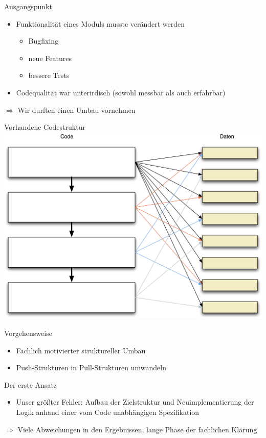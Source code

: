 \begin{frame}[t,fragile]{Ausgangspunkt}
\begin{itemize}
\item Funktionalität eines Moduls musste verändert werden
\begin{itemize}
\item Bugfixing
\item neue Features
\item bessere Tests
\end{itemize}
\item Codequalität war unterirdisch (sowohl messbar als auch erfahrbar)
\end{itemize}

$\Longrightarrow$ Wir durften einen Umbau vornehmen
\end{frame}

\begin{frame}[t,fragile]{Vorhandene Codestruktur}
\includegraphics[width=.8 \paperwidth]{Codestruktur.png}
\end{frame}



\begin{frame}[t,fragile]{Vorgehensweise}
\begin{itemize}
\item Fachlich motivierter struktureller Umbau
\item Push-Strukturen in Pull-Strukturen umwandeln
\end{itemize}
\end{frame}

\begin{frame}[t,fragile]{Der erste Ansatz}
\begin{itemize}
\item Unser größter Fehler: Aufbau der Zielstruktur und Neuimplementierung der Logik anhand einer vom Code unabhängigen Spezifikation
\end{itemize}
$\Longrightarrow$ Viele Abweichungen in den Ergebnissen, lange Phase der fachlichen Klärung
\end{frame}

